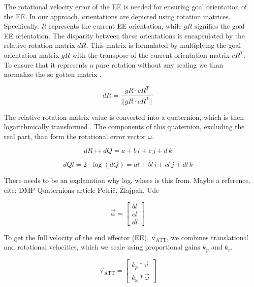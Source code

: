 \documentclass[letterpaper, 10 pt, conference]{ieeeconf}  %
\begin{document}
The rotational velocity error of the EE is needed for ensuring goal orientation of the EE. In our approach, orientations are depicted using rotation matrices. Specifically, \( R \) represents the current EE orientation, while \( gR \) signifies the goal EE orientation. The disparity between these orientations is encapsulated by the relative rotation matrix \( dR \). This matrix is formulated by multiplying the goal orientation matrix \( gR \) with the transpose of the current orientation matrix \( cR^{T} \). To ensure that it represents a pure rotation without any scaling we than normalize the so gotten matrix .

\begin{equation}
	dR = \frac{gR \cdot cR^{T}}{||gR \cdot cR^{T}||}
	\label{eq: rot_diff_mat}
\end{equation}

The relative rotation matrix value is converted into a quaternion, which is then logarithmically transformed . The components of this quaternion, excluding the real part, than form the rotational error vector \( \omega \).

\begin{equation}
	dR \mapsto dQ = a + b \, i + c \, j + d \, k
	\label{eq: quat_mapsto}
\end{equation}

\begin{equation}
	dQl = 2 \cdot \log(dQ) = al + bl \, i + cl \, j + dl \, k
	\label{eq:quat_log}
\end{equation}

\alert{There needs to be an explanation why log, where is this from. Maybe a reference. cite: DMP Quaternions article Petrič, Žlajpah, Ude}



\begin{equation}
	\vec{\omega} =
	\begin{bmatrix}
		bl \\
		cl \\
		dl
	\end{bmatrix}
	\label{eq:rot_error_vector}
\end{equation}

To get the full velocity of the end effector (EE), \( \mathrm{\vec{v}_{ATT}} \), we combines translational and rotational velocities, which we scale using proportional gains \( k_p \) and \( k_r \).

\begin{equation}
	\mathrm{\vec{v}_{ATT}} = 
	\begin{bmatrix}
		k_p * \vec{v}   \\
		k_{\omega} * \vec{\omega}
	\end{bmatrix}
	\label{eq:ee_velocity}
\end{equation}
\end{document}
